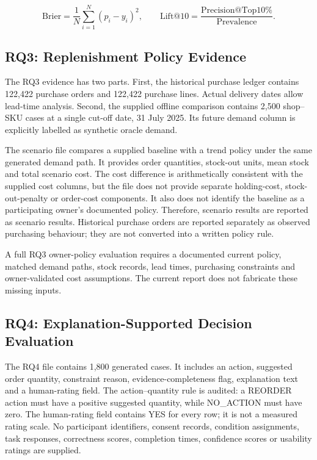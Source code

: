 \[
\mathrm{Brier}=\frac{1}{N}\sum_{i=1}^{N}(p_i-y_i)^2,
\qquad
\mathrm{Lift@10}=\frac{\mathrm{Precision@Top10\%}}{\mathrm{Prevalence}}.
\]

\subsection{RQ3: Replenishment Policy Evidence}
The RQ3 evidence has two parts. First, the historical purchase ledger contains 122,422 purchase orders and 122,422 purchase lines. Actual delivery dates allow lead-time analysis. Second, the supplied offline comparison contains 2,500 shop--SKU cases at a single cut-off date, 31 July 2025. Its future demand column is explicitly labelled as synthetic oracle demand.

The scenario file compares a supplied baseline with a trend policy under the same generated demand path. It provides order quantities, stock-out units, mean stock and total scenario cost. The cost difference is arithmetically consistent with the supplied cost columns, but the file does not provide separate holding-cost, stock-out-penalty or order-cost components. It also does not identify the baseline as a participating owner's documented policy. Therefore, scenario results are reported as scenario results. Historical purchase orders are reported separately as observed purchasing behaviour; they are not converted into a written policy rule.

A full RQ3 owner-policy evaluation requires a documented current policy, matched demand paths, stock records, lead times, purchasing constraints and owner-validated cost assumptions. The current report does not fabricate these missing inputs.

\subsection{RQ4: Explanation-Supported Decision Evaluation}
The RQ4 file contains 1,800 generated cases. It includes an action, suggested order quantity, constraint reason, evidence-completeness flag, explanation text and a human-rating field. The action--quantity rule is audited: a REORDER action must have a positive suggested quantity, while NO_ACTION must have zero. The human-rating field contains YES for every row; it is not a measured rating scale. No participant identifiers, consent records, condition assignments, task responses, correctness scores, completion times, confidence scores or usability ratings are supplied.

